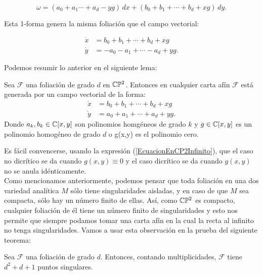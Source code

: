 \begin{equation}
\omega=(a_{0}+a_{1}\cdots+a_{d}-yg)\, dx+(b_{0}+b_{1}+\cdots+b_{d}+xg)\, dy.
\end{equation} 

\noindent Esta 1-forma genera la misma foliación que el campo vectorial:

\begin{equation}
\begin{aligned}
\dot{x} &= b_{0}+b_{1}+\cdots+b_{d}+xg\\
\dot{y} &= -a_{0}-a_{1}+\cdots-a_{d}+yg.
\end{aligned}
\end{equation}

Podemos resumir lo anterior en el siguiente lema:

\begin{Lema}
Sea $\mathcal{F}$ una foliación de grado $d$ en $\mathbb{C}\mathbb{P}^{2}$. Entonces en cualquier carta afín $\mathcal{F}$ está generada por un campo vectorial de la forma:
\begin{equation}
\begin{aligned}
\dot{x} &= b_{0}+b_{1}+\cdots+b_{d}+xg\\
\dot{y} &= a_{0}+a_{1}+\cdots+a_{d}+yg.
\end{aligned}
\end{equation}
Donde $a_{k},b_{k}\in\mathbb{C}[x,y]$ son polinomios homgéneos de grado $k$ y $g\in\mathbb{C}[x,y]$ es un polinomio homogéneo de grado $d$ o g(x,y) es el polinomio cero.
\end{Lema}

Es fácil convencerse, usando la expresión (\ref{EcuacionEnCP2Infinito}), que el caso no dicrítico se da cuando $g(x,y)\equiv 0$ y el caso dicrítico se da cuando $g(x,y)$ no se anula idénticamente.\\

Como mencionamos anteriormente, podemos pensar que toda foliación en una dos variedad analítica $M$ sólo tiene singularidades aisladas, y en caso de que $M$ sea compacta, sólo hay un número finito de ellas. Así, como $\mathbb{C}\mathbb{P}^{2}$ es compacto, cualquier foliación de él tiene un número finito de singularidades y esto nos permite que siempre podamos tomar una carta afín en la cual la recta al infinito no tenga singularidades. Vamos a usar esta observación en la prueba del siguiente teorema:

\begin{Teorema}
Sea $\mathcal{F}$ una foliación de grado $d$. Entonces, contando multiplicidades, $\mathcal{F}$ tiene $d^{2}+d+1$ puntos singulares.
\end{Teorema}

